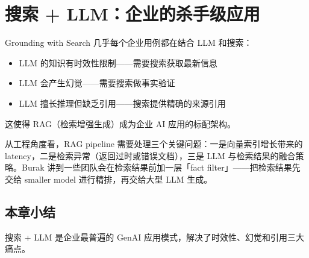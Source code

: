 \section{搜索 + LLM：企业的杀手级应用}

\begin{importantbox}{Grounding with Search}
几乎每个企业用例都在结合 LLM 和搜索：
\begin{itemize}
    \item LLM 的知识有时效性限制——需要搜索获取最新信息
    \item LLM 会产生幻觉——需要搜索做事实验证
    \item LLM 擅长推理但缺乏引用——搜索提供精确的来源引用
\end{itemize}
这使得 RAG（检索增强生成）成为企业 AI 应用的标配架构。
\end{importantbox}

从工程角度看，RAG pipeline 需要处理三个关键问题：一是向量索引增长带来的 latency，二是检索异常（返回过时或错误文档），三是 LLM 与检索结果的融合策略。Burak 讲到一些团队会在检索结果前加一层「fact filter」——把检索结果先交给 smaller model 进行精排，再交给大型 LLM 生成。

\subsection{本章小结}

搜索 + LLM 是企业最普遍的 GenAI 应用模式，解决了时效性、幻觉和引用三大痛点。

